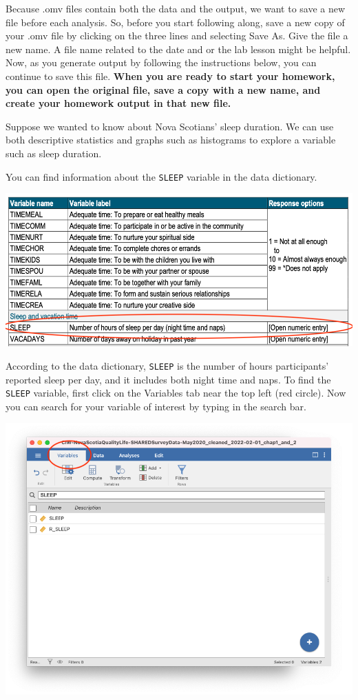 \documentclass[
]{book}
\begin{document}
Because .omv files contain both the data and the output, we want to save a new file before each analysis. So, before you start following along, save a new copy of your .omv file by clicking on the three lines and selecting {Save As}. Give the file a new name. A file name related to the date and or the lab lesson might be helpful. Now, as you generate output by following the instructions below, you can continue to save this file. \textbf{When you are ready to start your homework, you can open the original file, save a copy with a new name, and create your homework output in that new file.}

Suppose we wanted to know about Nova Scotians' sleep duration. We can use both descriptive statistics and graphs such as histograms to explore a variable such as sleep duration.

You can find information about the \texttt{SLEEP} variable in the data dictionary.

\includegraphics{img/sleepdatadictionary.png}

According to the data dictionary, \texttt{SLEEP} is the number of hours participants' reported sleep per day, and it includes both night time and naps. To find the \texttt{SLEEP} variable, first click on the Variables tab near the top left (red circle). Now you can search for your variable of interest by typing in the search bar.

\includegraphics{img/sleepsearch.png}
\end{document}
